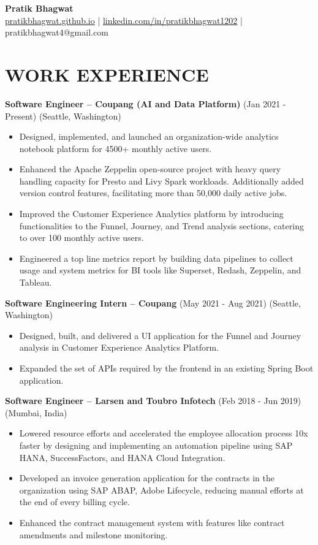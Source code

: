 \documentclass[a4paper,10pt]{article}
\begin{document}
\begin{center}
    {\LARGE \textbf{Pratik Bhagwat}} \\ 
    \smallskip
    \href{https://pratikbhagwat.github.io}{pratikbhagwat.github.io} |
    \href{https://linkedin.com/in/pratikbhagwat1202}{linkedin.com/in/pratikbhagwat1202} |
    pratikbhagwat4@gmail.com
\end{center}

\section*{\textbf{WORK EXPERIENCE}}

\noindent\textbf{Software Engineer – Coupang (AI and Data Platform)} (Jan 2021 - Present) (Seattle, Washington)
\begin{itemize}[noitemsep, topsep=0pt]
    \item Designed, implemented, and launched an organization-wide analytics notebook platform for 4500+ monthly active users.
    \item Enhanced the Apache Zeppelin open-source project with heavy query handling capacity for Presto and Livy Spark workloads. Additionally added version control features, facilitating more than 50,000 daily active jobs.
    \item Improved the Customer Experience Analytics platform by introducing functionalities to the Funnel, Journey, and Trend analysis sections, catering to over 100 monthly active users.
    \item Engineered a top line metrics report by building data pipelines to collect usage and system metrics for BI tools like Superset, Redash, Zeppelin, and Tableau.
\end{itemize}

\noindent\textbf{Software Engineering Intern – Coupang} (May 2021 - Aug 2021)  (Seattle, Washington)
\begin{itemize}[noitemsep, topsep=0pt]
    \item Designed, built, and delivered a UI application for the Funnel and Journey analysis in Customer Experience Analytics Platform.
    \item Expanded the set of APIs required by the frontend in an existing Spring Boot application.
\end{itemize}

\noindent\textbf{Software Engineer – Larsen and Toubro Infotech} (Feb 2018 - Jun 2019) (Mumbai, India)
\begin{itemize}[noitemsep, topsep=0pt]
    \item Lowered resource efforts and accelerated the employee allocation process 10x faster by designing and implementing an automation pipeline using SAP HANA, SuccessFactors, and HANA Cloud Integration.
    \item Developed an invoice generation application for the contracts in the organization using SAP ABAP, Adobe Lifecycle, reducing manual efforts at the end of every billing cycle.
    \item Enhanced the contract management system with features like contract amendments and milestone monitoring.
\end{itemize}
\end{document}
